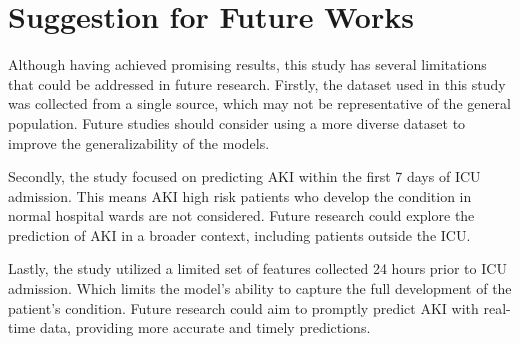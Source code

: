\documentclass[../main.tex]{subfiles}
\begin{document}
\section{Suggestion for Future Works }

Although having achieved promising results, this study has several limitations that could be addressed in future research.
Firstly, the dataset used in this study was collected from a single source, which may not be representative of the general population.
Future studies should consider using a more diverse dataset to improve the generalizability of the models.

Secondly, the study focused on predicting \gls{AKI} within the first 7 days of \gls{ICU} admission.
This means \gls{AKI} high risk patients who develop the condition in normal hospital wards are not considered.
Future research could explore the prediction of \gls{AKI} in a broader context, including patients outside the ICU.

Lastly, the study utilized a limited set of features collected 24 hours prior to \gls{ICU} admission.
Which limits the model's ability to capture the full development of the patient's condition.
Future research could aim to promptly predict \gls{AKI} with real-time data, providing more accurate and timely predictions.
\end{document}
